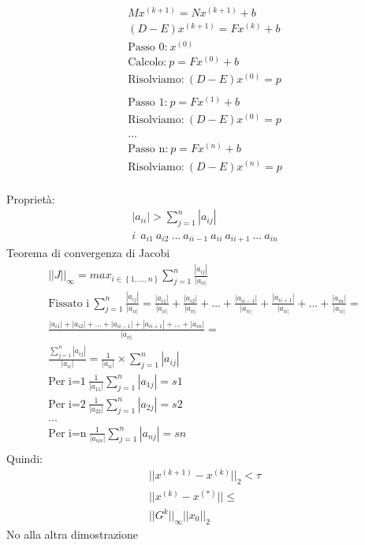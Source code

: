 \documentclass{article} %
\begin{document}
\begin{center}
\begin{align*}
    Mx^{(k+1)}=Nx^{(k+1)}+b\\
    (D-E)x^{(k+1)}=Fx^{(k)}+b\\
    \text{Passo 0:}\ x^{(0)}\\
    \text{Calcolo:}\ p=Fx^{(0)}+b\\
    \text{Risolviamo:}\ (D-E)x^{(0)}=p\\
    \\
    \text{Passo 1:}\ p=Fx^{(1)}+b\\
    \text{Risolviamo:}\ (D-E)x^{(0)}=p\\
    \\
    \dots
    \\
    \text{Passo n:}\ p=Fx^{(n)}+b\\
    \text{Risolviamo:}\ (D-E)x^{(n)}=p\\
\end{align*}

Proprietà:
\begin{align*}
    |a_{ii}|>\sum_{j=1}^{n}|a_{ij}|\\
    i\ \ a_{i1}\ a_{i2}\ ...\ a_{ii-1}\ a_{ii}\ a_{ii+1}\ ...\ a_{in}
\end{align*}
    Teorema di convergenza di Jacobi
    \begin{align*}
        ||J||_{\infty}=max_{i \in \left\{ 1,...,n\right\}} \sum_{j=1}^{n} \frac{|a_{ij}|}{|a_{ii|}}\\
        \text{Fissato i}\ \sum_{j=1}^{n} \frac{|a_{ij}|}{|a_{ii|}}= \frac{|a_{i1}|}{|a_{ii|}}+\frac{|a_{i2}|}{|a_{ii|}}+
        ...+\frac{|a_{ii-1}|}{|a_{ii|}}+\frac{|a_{ii+1}|}{|a_{ii|}}+...+\frac{|a_{in}|}{|a_{ii|}}=\\
        \frac{|a_{i1}|+|a_{i2}|+...+|a_{ii-1}|+|a_{ii+1}|+...+|a_{in}|}{|a_{ii|}}=\\
        \frac{\sum_{j=1}^{n}|a_{ij}|}{|a_{ii}|}=\frac{1}{|a_{ii}|} \times \sum_{j=1}^{n}|a_{ij}|\\
        \text{Per i=1}\ \frac{1}{|a_{11}|}\sum_{j=1}^{n}|a_{1j}|=s1\\
        \text{Per i=2}\ \frac{1}{|a_{22}|}\sum_{j=1}^{n}|a_{2j}|=s2\\
        \dots\\
        \text{Per i=n}\ \frac{1}{|a_{nn}|}\sum_{j=1}^{n}|a_{nj}|=sn\\
    \end{align*}
    Quindi:
    \begin{align*}
        ||x^{(k+1)}-x^{(k)}||_2 < \tau\\
        ||x^{(k)}-x^{(*)}|| \leq\\
        ||G^k||_{\infty}||x_0||_2
    \end{align*}
    No alla altra dimostrazione

    


\end{center}
\end{document}
